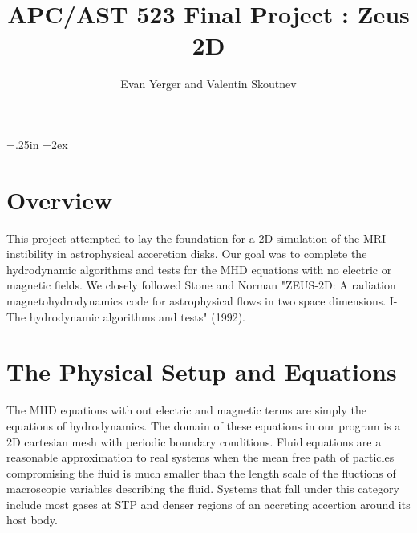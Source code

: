 \parindent=.25in
\parskip=2ex

\title{APC/AST 523 Final Project : Zeus 2D}
\author{Evan Yerger and Valentin Skoutnev}


\pagestyle{empty}

\maketitle

\def\normalbaselines{\baselineskip20pt \lineskip3pt \lineskiplimit3pt}

\def\mapright{\smash{\mathop{\longrightarrow}}}
\def\mapincl{\smash{\mathop{\hookrightarrow}}}
\def\mapup{\Big\uparrow}
\def\mapdown{\Big\downarrow}
\def\mapdowneq{\Big\parallel}

\def\Mapright#1{\smash{\mathop{\longrightarrow}\limits^{#1}}}
\def\Mapincl#1{\smash{\mathop{\hookrightarrow}\limits^{#1}}}
\def\Mapup#1{\Big\uparrow\rlap{$\vcenter{\hbox{$\scriptstyle#1$}}$}}
\def\Mapdown#1{\Big\downarrow\rlap{$\vcenter{\hbox{$\scriptstyle#1$}}$}}
\def\Mapdowneq#1{\Big\parallel\rlap{$\vcenter{\hbox{$\scriptstyle#1$}}$}}

\section{Overview}
This project attempted to lay the foundation for a 2D simulation of the MRI instibility in astrophysical acceretion disks. Our goal was to complete the hydrodynamic algorithms and tests for the MHD equations with no electric or magnetic fields. We closely followed Stone and Norman "ZEUS-2D: A radiation magnetohydrodynamics code for astrophysical flows in two space dimensions. I-The hydrodynamic algorithms and tests" (1992). 

\section{The Physical Setup and Equations}
The MHD equations with out electric and magnetic terms are simply the equations of hydrodynamics. The domain of these equations in our program is a 2D cartesian mesh with periodic boundary conditions. Fluid equations are a reasonable approximation to real systems when the mean free path of particles compromising the fluid is much smaller than the length scale of the fluctions of macroscopic variables describing the fluid. Systems that fall under this category include most gases at STP and denser regions of an accreting accertion around its host body.
    
